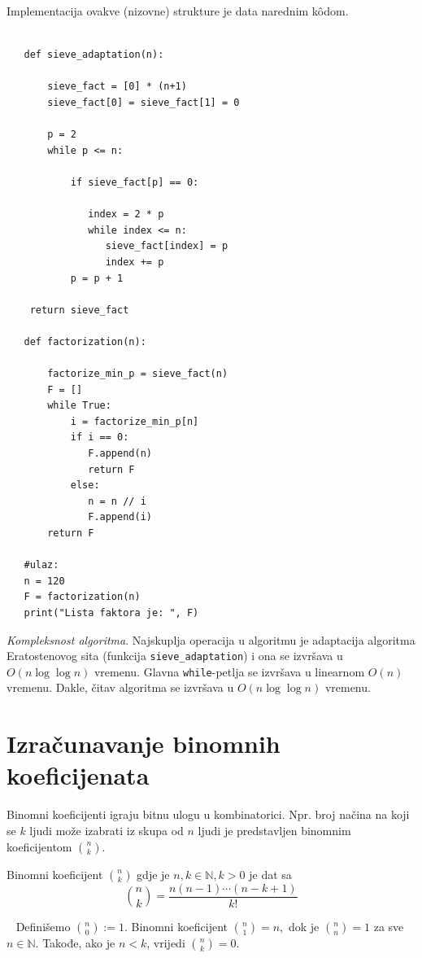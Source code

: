  Implementacija ovakve (nizovne) strukture je data narednim k\^odom. 
 
 \begin{verbatim}
 
   def sieve_adaptation(n):
   
       sieve_fact = [0] * (n+1)
       sieve_fact[0] = sieve_fact[1] = 0
       
       p = 2
       while p <= n:
       
           if sieve_fact[p] == 0:
       
       		  index = 2 * p
       		  while index <= n:
       			 sieve_fact[index] = p
       			 index += p
           p = p + 1
 	
	return sieve_fact
 	
   def factorization(n):
       
       factorize_min_p = sieve_fact(n)
       F = []
       while True: 
           i = factorize_min_p[n]
           if i == 0: 
              F.append(n)
              return F
           else:
              n = n // i
              F.append(i)
       return F  
   
   #ulaz: 
   n = 120
   F = factorization(n)
   print("Lista faktora je: ", F)
 \end{verbatim} 
 
\textit{Kompleksnost algoritma}. Najskuplja operacija u algoritmu je adaptacija algoritma Eratostenovog sita (funkcija \texttt{sieve\_adaptation}) i ona se izvršava u $O(n \log \log n)$ vremenu. Glavna \texttt{while}-petlja se izvršava u linearnom $O(n)$ vremenu. Dakle, čitav algoritma se izvršava u 
 $O(n \log \log n)$ vremenu.
 
  \section{Izračunavanje binomnih koeficijenata} 
  
  Binomni koeficijenti igraju bitnu ulogu u kombinatorici. Npr. broj načina na koji se $k$ ljudi može izabrati iz skupa od $n$ ljudi je predstavljen binomnim koeficijentom $\binom{n}{k}$. 
  
  \begin{definition}
  	 Binomni koeficijent $\binom{n}{k}$ gdje je $n, k \in \mathbb{N}, k > 0$  je dat sa 
  	 $$\binom{n}{k} = \frac{n(n-1) \cdots (n-k+1)}{k!}$$
  \end{definition}
  
~ Definišemo $\binom{n}{0} := 1$. Binomni koeficijent $\binom{n}{1} = n,$ dok je $\binom{n}{n} = 1$ za sve $n \in \mathbb{N}.$ Takođe, ako je $n <k$, vrijedi $\binom{n}{k}=0$.
 
